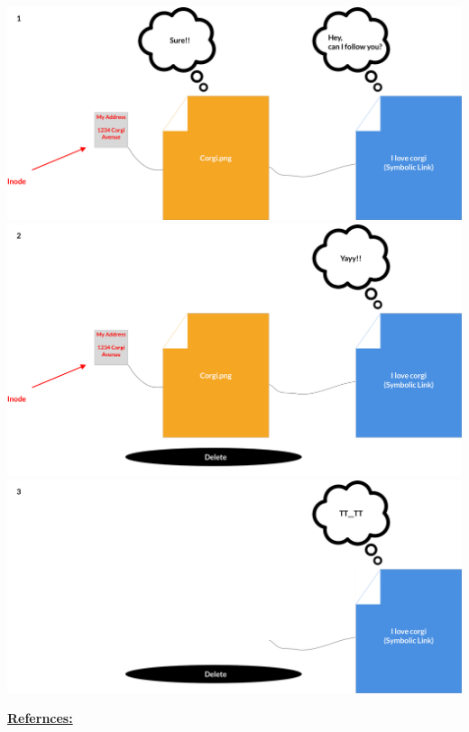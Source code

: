 \documentclass[12pt]{article}
\begin{document}
\begin{itemize}
    \begin{center}
    \includegraphics[width=0.8\linewidth]{images/week_8_notes_1_4.png}
    \includegraphics[width=0.8\linewidth]{images/week_8_notes_1_5.png}
    \includegraphics[width=0.8\linewidth]{images/week_8_notes_1_6.png}
    \end{center}

    \bigskip

    \underline{\textbf{Refernces:}}

    \bigskip


\end{itemize}
\end{document}
